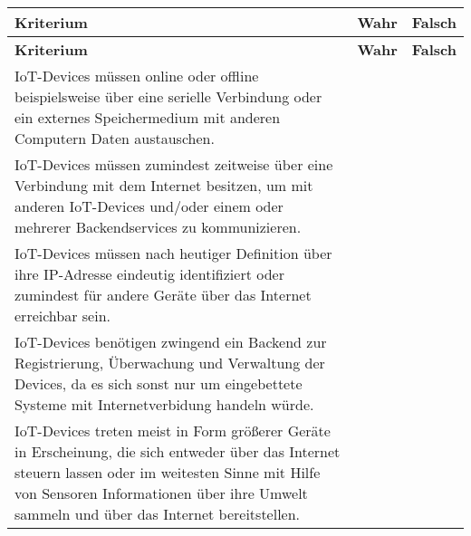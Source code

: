 \newcommand{\DefinitionIoT}[1]{
    {
        \renewcommand{\arraystretch}{1.5}
        \begin{longtable}{|p{0.71\textwidth}|p{0.1\textwidth}|p{0.1\textwidth}|}
            \hline
            \textbf{Kriterium} & \textbf{Wahr} & \textbf{Falsch} \\
            \endfirsthead

            \hline
            \textbf{Kriterium} & \textbf{Wahr} & \textbf{Falsch} \\
            \endhead

            \hline
            \endlastfoot

            \hline %
            IoT-Devices müssen online oder offline beispielsweise über eine
            serielle Verbindung oder ein externes Speichermedium mit anderen
            Computern Daten austauschen.
            &
            & #1
            \\

            \hline %
            IoT-Devices müssen zumindest zeitweise über eine Verbindung mit
            dem Internet besitzen, um mit anderen IoT-Devices und/oder einem
            oder mehrerer Backendservices zu kommunizieren.
            & #1
            &
            \\

            \hline %
            IoT-Devices müssen nach heutiger Definition über ihre IP-Adresse
            eindeutig identifiziert oder zumindest für andere Geräte über das
            Internet erreichbar sein.
            & #1
            &
            \\

            \hline %
            IoT-Devices benötigen zwingend ein Backend zur Registrierung,
            Überwachung und Verwaltung der Devices, da es sich sonst nur
            um eingebettete Systeme mit Internetverbidung handeln würde.
            &
            & #1
            \\

            \hline %
            IoT-Devices treten meist in Form größerer Geräte in Erscheinung,
            die sich entweder über das Internet steuern lassen oder im weitesten
            Sinne mit Hilfe von Sensoren Informationen über ihre Umwelt sammeln
            und über das Internet bereitstellen.
            & #1
            &
            \\
        \end{longtable}
    }
}
\DefinitionIoT{}

